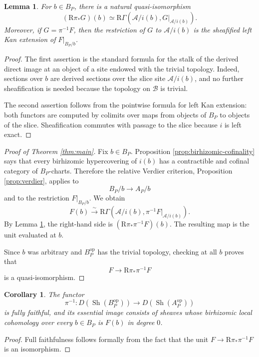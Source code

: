 \documentclass{article}
\newtheorem{lemma}[theorem]{Lemma}
\newtheorem{corollary}[theorem]{Corollary}
\theoremstyle{definition}
\theoremstyle{remark}
\newcommand{\op}{{\mathrm{op}}}
\newcommand{\Sh}{\operatorname{Sh}}
\newcommand{\R}{\mathrm{R}}
\begin{document}
\begin{lemma}\label{lem:slice-formula}
For \(b\in B_P\), there is a natural quasi-isomorphism
\[
(\R\pi_*G)(b)\simeq
\R\Gamma\!\left(\mathcal A/i(b),G|_{\mathcal A/i(b)}\right).
\]
Moreover, if \(G=\pi^{-1}F\), then the restriction of \(G\) to \(\mathcal A/i(b)\) is the sheafified left Kan extension of \(F|_{B_P/b}\).
\end{lemma}

\begin{proof}
The first assertion is the standard formula for the stalk of the derived direct image at an object of a site endowed with the trivial topology.  Indeed, sections over \(b\) are derived sections over the slice site \(\mathcal A/i(b)\), and no further sheafification is needed because the topology on \(\mathcal B\) is trivial.

The second assertion follows from the pointwise formula for left Kan extension: both functors are computed by colimits over maps from objects of \(B_P\) to objects of the slice.  Sheafification commutes with passage to the slice because \(i\) is left exact.
\end{proof}

\begin{proof}[Proof of Theorem \ref{thm:main}]
Fix \(b\in B_P\).  Proposition \ref{prop:birhizomic-cofinality} says that every birhizomic hypercovering of \(i(b)\) has a contractible and cofinal category of \(B_P\)-charts.  Therefore the relative Verdier criterion, Proposition \ref{prop:verdier}, applies to
\[
B_P/b\longrightarrow A_P/b
\]
and to the restriction \(F|_{B_P/b}\).  We obtain
\[
F(b)\xrightarrow{\sim}
\R\Gamma\!\left(\mathcal A/i(b),
\pi^{-1}F|_{\mathcal A/i(b)}\right).
\]
By Lemma \ref{lem:slice-formula}, the right-hand side is \((\R\pi_*\pi^{-1}F)(b)\).  The resulting map is the unit evaluated at \(b\).

Since \(b\) was arbitrary and \(B_P^{\op}\) has the trivial topology, checking at all \(b\) proves that
\[
F\longrightarrow \R\pi_*\pi^{-1}F
\]
is a quasi-isomorphism.
\end{proof}

\begin{corollary}
The functor
\[
\pi^{-1}:D(\Sh(B_P^{\op}))\longrightarrow D(\Sh(A_P^{\op}))
\]
is fully faithful, and its essential image consists of sheaves whose birhizomic local cohomology over every \(b\in B_P\) is \(F(b)\) in degree \(0\).
\end{corollary}

\begin{proof}
Full faithfulness follows formally from the fact that the unit \(F\to\R\pi_*\pi^{-1}F\) is an isomorphism.
\end{proof}
\end{document}
